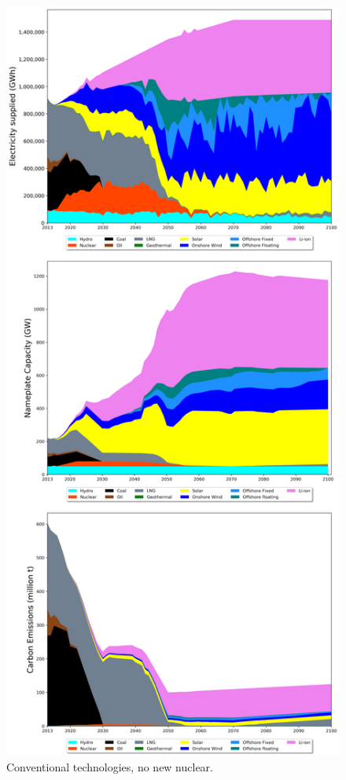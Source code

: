\begin{figure}[htb]
\includegraphics[scale=0.42]{figures/conv_nonuc}
\caption{Conventional technologies, no new nuclear.}
\label{scen1}
\end{figure}

